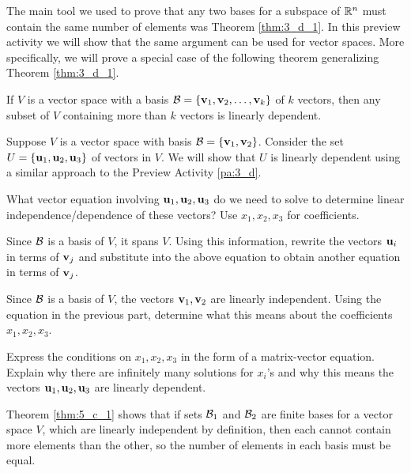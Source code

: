 \begin{pa} \label{pa:5_c} The main tool we used to prove that any two bases for a subspace of $\mathbb{R}^n$ must contain the same number of elements was Theorem \ref{thm:3_d_1}. In this preview activity we will show that the same argument can be used for vector spaces. More specifically, we will prove a special case of the following theorem generalizing Theorem \ref{thm:3_d_1}.

\begin{theorem} \label{thm:5_c_1} If $V$ is a vector space with a basis $\mathcal{B} = \{\mathbf{v}_1, \mathbf{v}_2, \ldots, \mathbf{v}_k\}$ of $k$ vectors, then any subset of $V$ containing more than $k$ vectors is linearly dependent.
\end{theorem} 

Suppose $V$ is a vector space with basis $\mathcal{B} = \{\mathbf{v}_1, \mathbf{v}_2\}$. Consider the set $U=\{\mathbf{u}_1, \mathbf{u}_2, \mathbf{u}_3\}$ of vectors in $V$. We will show that $U$ is linearly dependent using a similar approach to the Preview Activity \ref{pa:3_d}.

\be

\item What vector equation involving $\mathbf{u}_1, \mathbf{u}_2, \mathbf{u}_3$ do we need to solve to determine linear independence/dependence of these vectors? Use $x_1, x_2, x_3$ for coefficients.

\item Since $\mathcal{B}$ is a basis of $V$, it spans $V$. Using this information, rewrite the vectors $\mathbf{u}_i$ in terms of $\mathbf{v}_j$ and substitute into the above equation to obtain another equation in terms of $\mathbf{v}_j$.

\item Since $\mathcal{B}$ is a basis of $V$, the vectors $\mathbf{v}_1, \mathbf{v}_2$ are linearly independent. Using the equation in the previous part, determine what this means about the coefficients $x_1, x_2, x_3$.

\item Express the conditions on $x_1, x_2, x_3$ in the form of a matrix-vector equation. Explain why there are infinitely many solutions for $x_i$'s and why this means the vectors $\mathbf{u}_1, \mathbf{u}_2, \mathbf{u}_3$ are linearly dependent.

\ee


\end{pa}





Theorem \ref{thm:5_c_1} shows that if sets $\mathcal{B}_1$ and $\mathcal{B}_2$ are finite bases for a vector space $V$, which are linearly independent by definition, then each cannot contain more elements than the other, so the number of elements in each basis must be equal. 

